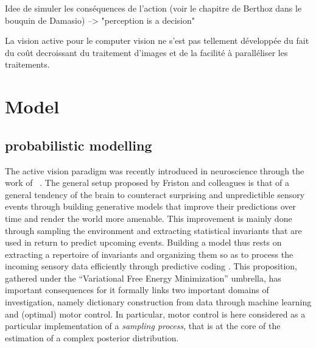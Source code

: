 \documentclass[12pt,twoside,openright]{article}
\begin{document}
    
	{\color{green} Idee de simuler les conséquences de l'action (voir le chapitre de Berthoz dans le bouquin de Damasio) --> "perception is a decision"}

	{\color{green} La vision active pour le computer vision ne s'est pas tellement développée du fait du coût decroissant du traitement d'images et de la facilité à paralléliser les traitements.}
	
	\section{Model}
	
	\subsection{probabilistic modelling}

	The active vision paradigm was recently introduced in neuroscience through the work of ~\cite{friston2010free,friston2012perceptions}. %
	The general setup proposed by Friston and colleagues is that of a general tendency of the brain to counteract surprising and unpredictible sensory events through building generative models that improve their predictions over time and render the world more amenable. This improvement is mainly done through sampling the environment and extracting statistical invariants that are used in return to predict upcoming events.
	Building a model thus rests on extracting a repertoire of invariants and organizing them so as to process the incoming sensory data efficiently through predictive coding \cite{rao1999predictive}. This proposition, gathered under the ``Variational Free Energy Minimization'' umbrella, has important consequences for it formally links two important domains of investigation, namely dictionary construction from data through machine learning and (optimal) motor control.
	In particular, motor control is here considered as a particular implementation of a \emph{sampling process}, that is at the core of the estimation of a complex posterior distribution. 
	
\end{document}
